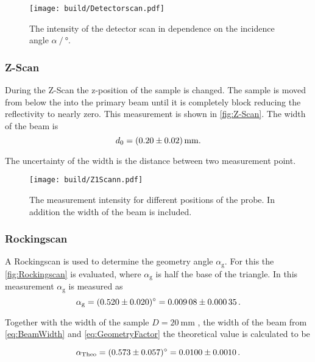 \begin{figure}[H]
    \centering
    \texttt{[image: build/Detectorscan.pdf]}
    \caption{The intensity of the detector scan in dependence on the incidence angle $\alpha \mathbin{/} \unit{\degree}$.}
    \label{fig:Detectorscan}
\end{figure}

\subsubsection{Z-Scan}

During the Z-Scan the z-position of the sample is changed. 
The sample is moved from below the into the primary beam until it is completely block reducing the reflectivity to nearly zero.
This measurement is shown in \autoref{fig:Z-Scan}.
The width of the beam is 
\begin{equation*}
    d_0 = \SI{0.20 \pm 0.02}{\milli\meter}.
    \label{eq:BeamWidth}
\end{equation*}

The uncertainty of the width is the distance between two measurement point.

\begin{figure}[H]
    \centering
    \texttt{[image: build/Z1Scann.pdf]}
    \caption{The measurement intensity for different positions of the probe. In addition the width of the beam is included.} 
    \label{fig:Z-Scan}
\end{figure}



\subsubsection{Rockingscan}

A Rockingscan is used to determine the geometry angle $\alpha_\text{g}$. 
For this the \autoref{fig:Rockingscan} is evaluated, where $\alpha_\text{g}$ is half the base of the triangle.
In this measurement $\alpha_\text{g}$ is measured as 
\begin{equation*}
    \alpha_\text{g} = \SI{0.520 \pm 0.020}{\degree} = \num{0.00908 \pm 0.00035}\,.
\end{equation*}

Together with the width of the sample $D = \SI{20}{\milli\meter}$ \cite{v44}, the width of the beam from \autoref{eq:BeamWidth} and \autoref{eq:GeometryFactor} the theoretical value is calculated to be 

\begin{equation*}
    \alpha_\text{Theo}  = \SI{0.573 \pm 0.057}{\degree} = \num{0.0100 \pm 0.0010}\,.
\end{equation*}




